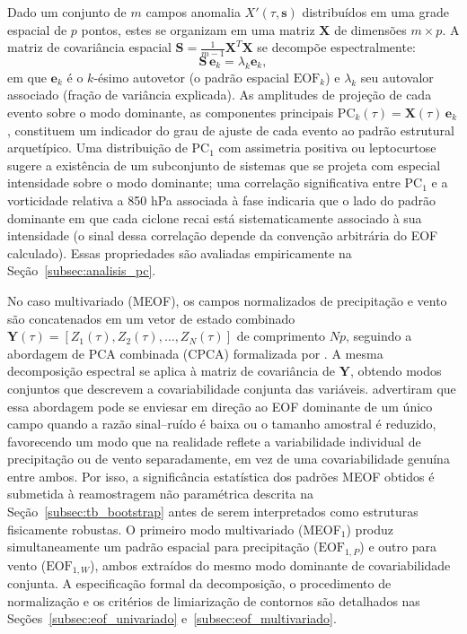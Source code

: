 Dado um conjunto de $m$ campos anomalia $X'(\tau, \mathbf{s})$ distribuídos em uma grade espacial de $p$ pontos, estes se organizam em uma matriz $\mathbf{X}$ de dimensões $m \times p$. A matriz de covariância espacial $\mathbf{S} = \frac{1}{m-1}\mathbf{X}^T\mathbf{X}$ se decompõe espectralmente:
\begin{equation}\label{eq:eof_decomp}
\mathbf{S}\,\mathbf{e}_k = \lambda_k \mathbf{e}_k,
\end{equation}
em que $\mathbf{e}_k$ é o $k$-ésimo autovetor (o padrão espacial $\text{EOF}_k$) e $\lambda_k$ seu autovalor associado (fração de variância explicada).
As amplitudes de projeção de cada evento sobre o modo dominante, as componentes principais PC$_k(\tau) = \mathbf{X}(\tau)\,\mathbf{e}_k$, constituem um indicador do grau de ajuste de cada evento ao padrão estrutural arquetípico.
Uma distribuição de PC$_1$ com assimetria positiva ou leptocurtose sugere a existência de um subconjunto de sistemas que se projeta com especial intensidade sobre o modo dominante; uma correlação significativa entre PC$_1$ e a vorticidade relativa a 850 hPa associada à fase indicaria que o lado do padrão dominante em que cada ciclone recai está sistematicamente associado à sua intensidade (o sinal dessa correlação depende da convenção arbitrária do EOF calculado).
Essas propriedades são avaliadas empiricamente na Seção~\ref{subsec:analisis_pc}.

No caso multivariado (MEOF), os campos normalizados de precipitação e vento são concatenados em um vetor de estado combinado $\mathbf{Y}(\tau) = [Z_1(\tau), Z_2(\tau), \dots, Z_N(\tau)]$ de comprimento $Np$, seguindo a abordagem de PCA combinada (CPCA) formalizada por \citet{bretherton1992intercomparison}.
A mesma decomposição espectral se aplica à matriz de covariância de $\mathbf{Y}$, obtendo modos conjuntos que descrevem a covariabilidade conjunta das variáveis.
\citet{bretherton1992intercomparison} advertiram que essa abordagem pode se enviesar em direção ao EOF dominante de um único campo quando a razão sinal--ruído é baixa ou o tamanho amostral é reduzido, favorecendo um modo que na realidade reflete a variabilidade individual de precipitação ou de vento separadamente, em vez de uma covariabilidade genuína entre ambos.
Por isso, a significância estatística dos padrões MEOF obtidos é submetida à reamostragem não paramétrica descrita na Seção~\ref{subsec:tb_bootstrap} antes de serem interpretados como estruturas fisicamente robustas.
O primeiro modo multivariado (MEOF$_1$) produz simultaneamente um padrão espacial para precipitação ($\text{EOF}_{1,P}$) e outro para vento ($\text{EOF}_{1,W}$), ambos extraídos do mesmo modo dominante de covariabilidade conjunta.
A especificação formal da decomposição, o procedimento de normalização e os critérios de limiarização de contornos são detalhados nas Seções~\ref{subsec:eof_univariado} e~\ref{subsec:eof_multivariado}.

